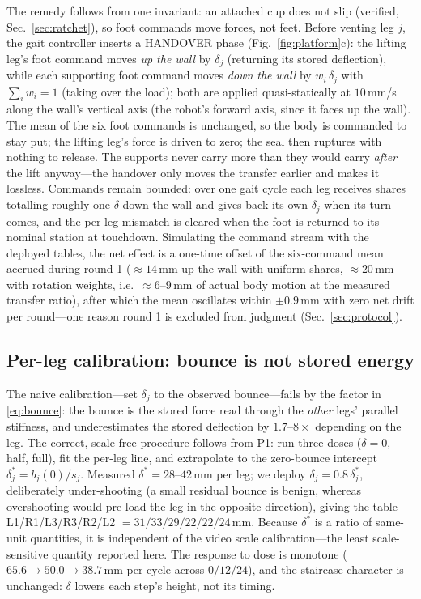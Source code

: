 \documentclass[journal]{IEEEtran}
\newcommand{\dstar}{\delta^{*}}
\begin{document}
The remedy follows from one invariant: an attached cup does not slip
(verified, Sec.~\ref{sec:ratchet}), so foot commands move forces, not
feet. Before venting leg $j$, the gait controller inserts a HANDOVER
phase (Fig.~\ref{fig:platform}c): the lifting leg's foot command moves
\emph{up the wall} by $\delta_j$ (returning its stored deflection),
while each supporting foot command moves \emph{down the wall} by
$w_i\,\delta_j$ with $\sum_{i} w_i = 1$ (taking over the load); both
are applied quasi-statically at $10$\,mm/s along the wall's vertical
axis (the robot's forward axis, since it faces up the wall). The mean of
the six foot commands is unchanged, so the body is commanded to stay
put; the lifting leg's force is driven to zero; the seal then ruptures
with nothing to release. The supports never carry more than they would
carry \emph{after} the lift anyway---the handover only moves the
transfer earlier and makes it lossless. Commands remain bounded: over
one gait cycle each leg receives shares totalling roughly one $\delta$
down the wall and gives back its own $\delta_j$ when its turn comes,
and the per-leg mismatch is cleared when the foot is returned to its
nominal station at touchdown. Simulating the command stream with the
deployed tables, the net effect is a one-time offset of the six-command
mean accrued during round 1 (${\approx}14$\,mm up the wall with uniform
shares, ${\approx}20$\,mm with rotation weights, i.e.\
${\approx}6$--$9$\,mm of actual body motion at the measured transfer
ratio), after which the mean oscillates within $\pm0.9$\,mm with zero
net drift per round---one reason round 1 is excluded from judgment
(Sec.~\ref{sec:protocol}).

\subsection{Per-leg calibration: bounce is not stored energy}
\label{sec:calib}

The naive calibration---set $\delta_j$ to the observed bounce---fails
by the factor in \eqref{eq:bounce}: the bounce is the stored force read
through the \emph{other} legs' parallel stiffness, and underestimates
the stored deflection by $1.7$--$8\times$ depending on the leg. The
correct, scale-free procedure follows from P1: run three doses
($\delta = 0$, half, full), fit the per-leg line, and extrapolate to the
zero-bounce intercept $\dstar_j = b_j(0)/s_j$. Measured
$\dstar = 28$--$42$\,mm per leg; we deploy $\delta_j = 0.8\,\dstar_j$,
deliberately under-shooting (a small residual bounce is benign, whereas
overshooting would pre-load the leg in the opposite direction), giving
the table
L1/R1/L3/R3/R2/L2 $= 31/33/29/22/22/24$\,mm. Because $\dstar$ is a
ratio of same-unit quantities, it is independent of the video scale
calibration---the least scale-sensitive quantity reported here. The
response to dose is monotone ($65.6\to50.0\to38.7$\,mm per cycle across
$0/12/24$), and the
staircase character is unchanged: $\delta$ lowers each step's height,
not its timing.
\end{document}
